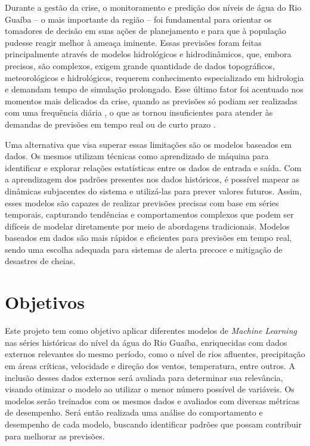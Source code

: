 \documentclass[
	12pt,				%
	openright,			%
	a4paper,			%
	english,			%
	french,				%
	spanish,			%
	brazil				%
	]{article}
\begin{document}
Durante a gestão da crise, o monitoramento e predição dos níveis de água do Rio Guaíba – o mais importante da região – foi fundamental para orientar os tomadores de decisão em suas ações de planejamento e para que à população pudesse reagir melhor à ameaça iminente. Essas previsões foram feitas principalmente através de modelos hidrológicos e hidrodinâmicos, que, embora precisos, são complexos, exigem grande quantidade de dados topográficos, meteorológicos e hidrológicos, requerem conhecimento especializado em hidrologia e demandam tempo de simulação prolongado. Esse último fator foi acentuado nos momentos mais delicados da crise, quando as previsões só podiam ser realizadas com uma frequência diária \cite{iph}, o que as tornou insuficientes para atender às demandas de previsões em tempo real ou de curto prazo \cite{atashi}.

Uma alternativa que visa superar essas limitações são os modelos baseados em dados. Os mesmos utilizam técnicas como aprendizado de máquina para identificar e explorar relações estatísticas entre os dados de entrada e saída. Com a aprendizagem dos padrões presentes nos dados históricos, é possível mapear as dinâmicas subjacentes do sistema e utilizá-las para prever valores futuros. Assim, esses modelos são capazes de realizar previsões precisas com base em séries temporais, capturando tendências e comportamentos complexos que podem ser difíceis de modelar diretamente por meio de abordagens tradicionais. Modelos baseados em dados são mais rápidos e eficientes para previsões em tempo real, sendo uma escolha adequada para sistemas de alerta precoce e mitigação de desastres de cheias\cite{ta}.

\section{Objetivos}
Este projeto tem como objetivo aplicar diferentes modelos de \textit{Machine Learning} nas séries históricas do nível da água do Rio Guaíba, enriquecidas com dados externos relevantes do mesmo período, como o nível de rios afluentes, precipitação em áreas críticas, velocidade e direção dos ventos, temperatura, entre outros. A inclusão desses dados externos será avaliada para determinar sua relevância, visando otimizar o modelo ao utilizar o menor número possível de variáveis. Os modelos serão treinados com os mesmos dados e avaliados com diversas métricas de desempenho. Será então realizada uma análise do comportamento e desempenho de cada modelo, buscando identificar padrões que possam contribuir para melhorar as previsões.
\end{document}

